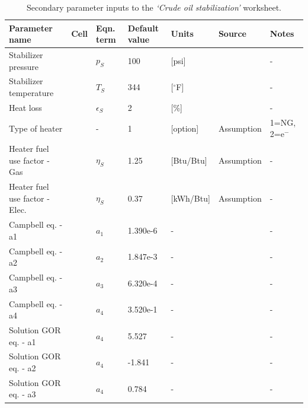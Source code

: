\documentclass[11pt]{report}
\newcommand{\cellref}[1]{\raisebox{1pt}{\fcolorbox{stanford}{light-gray}{\texttt{\textcolor{stanford}{\scriptsize{#1}}}}}}
\newcommand{\sheet}[1]{\textit{`{#1}'}}
\begin{document}
\begin{table}
\caption{Secondary parameter inputs to the \sheet{Crude oil stabilization} worksheet.}
\label{tab:Heater-treater_SI}
\begin{scriptsize}
\begin{tabularx}{1\columnwidth}{p{}p{}p{}p{}p{}p{}p{}}
\toprule
Parameter name			& Cell	& Eqn. term		& Default value   		& Units 	& Source			      			& Notes 		\\ 
\midrule
Stabilizer pressure			& \cellref{M42}	& $p_{S}$			& 100				& [psi]		& \cite{Manning1991}		& -			\\
Stabilizer temperature		& \cellref{M43}	& $T_S$			& 344				& [$^\circ$F]	& \cite{Manning1991}		& -			\\
Heat loss					& \cellref{M44}	& $\epsilon_{S}$	& 2					& [\%]		& \cite{Manning1991}		& -			\\
Type of heater				& \cellref{M45}	& -				& 1					& [option]		& Assumption				& 1=NG, 2=e$^-$			\\
Heater fuel use	factor - Gas	& \cellref{M46}	& $\eta_{S}$		& 1.25				& [Btu/Btu]	& Assumption				& -			\\
Heater fuel use factor - Elec.	& \cellref{M47}	& $\eta_{S}$		& 0.37				& [kWh/Btu]	& Assumption				& -			\\
Campbell eq. - a1			& \cellref{M49}	&$a_1$			& 1.390e-6			& -			& \cite{Manning1991}		& -			\\
Campbell eq. - a2			& \cellref{M50}	&$a_2$			& 1.847e-3			& - 			& \cite{Manning1991}		& -			\\
Campbell eq. - a3			& \cellref{M51}	&$a_3$			& 6.320e-4			& -			& \cite{Manning1991}		& -			\\
Campbell eq. - a4			& \cellref{M52}	&$a_4$			& 3.520e-1			& -			& \cite{Manning1991}		& -			\\
Solution GOR eq. - a1		& \cellref{M54}	&$a_4$			& 5.527				& -			& \cite{Fanchi2007,AlShammasi1999}		& -			\\
Solution GOR eq. - a2		& \cellref{M55}	&$a_4$			& -1.841				& -			& \cite{Fanchi2007,AlShammasi1999}		& -			\\
Solution GOR eq. - a3		& \cellref{M56}	&$a_4$			& 0.784				& -			& \cite{Fanchi2007,AlShammasi1999}		& -			\\
\bottomrule
\end{tabularx}
\end{scriptsize}
\end{table}
\end{document}
